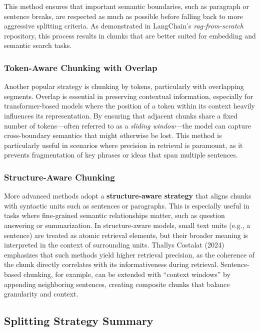 \documentclass[twocolumn, 10pt]{article}
\begin{document}
This method ensures that important semantic boundaries, such as paragraph or sentence breaks, are respected as much as possible before falling back to more aggressive splitting criteria. As demonstrated in LangChain’s \textit{rag-from-scratch} repository, this process results in chunks that are better suited for embedding and semantic search tasks.


\subsubsection{Token-Aware Chunking with Overlap}

Another popular strategy is chunking by tokens, particularly with overlapping segments. Overlap is essential in preserving contextual information, especially for transformer-based models where the position of a token within its context heavily influences its representation. By ensuring that adjacent chunks share a fixed number of tokens—often referred to as a \textit{sliding window}—the model can capture cross-boundary semantics that might otherwise be lost. This method is particularly useful in scenarios where precision in retrieval is paramount, as it prevents fragmentation of key phrases or ideas that span multiple sentences.

\subsubsection{Structure-Aware Chunking}

More advanced methods adopt a \textbf{structure-aware strategy} that aligns chunks with syntactic units such as sentences or paragraphs. This is especially useful in tasks where fine-grained semantic relationships matter, such as question answering or summarization. In structure-aware models, small text units (e.g., a sentence) are treated as atomic retrieval elements, but their broader meaning is interpreted in the context of surrounding units. Thallys Costalat (2024) emphasizes that such methods yield higher retrieval precision, as the coherence of the chunk directly correlates with its informativeness during retrieval. Sentence-based chunking, for example, can be extended with ``context windows'' by appending neighboring sentences, creating composite chunks that balance granularity and context.



\subsection{Splitting Strategy Summary}
\end{document}
